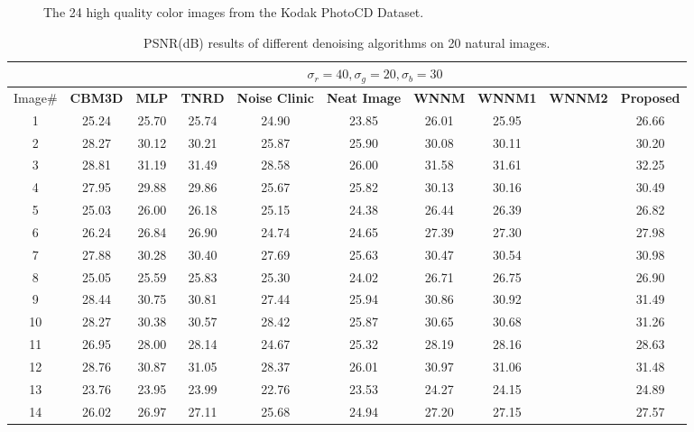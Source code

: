 \documentclass[10pt,twocolumn,letterpaper,sort&compress]{article}
\begin{document}
\begin{figure}
{\begin{minipage}{0.075\textwidth}
\end{minipage}
}\vspace{-1mm}
\caption{The 24 high quality color images from the Kodak PhotoCD Dataset.}
\label{fig3}
\vspace{-2mm}
\end{figure}


\begin{table}
\caption{PSNR(dB) results of different denoising algorithms on 20 natural images.}
\label{taba}
\begin{center}
\renewcommand\arraystretch{1.0}
\scriptsize
\begin{tabular}{|c||c|c|c|c|c|c|c|c|c|}
\hline
&\multicolumn{9}{c|}{ $\sigma_{r} = 40, \sigma_{g} = 20, \sigma_{b} = 30$}
\\
\hline
\hline
Image\#
&
\textbf{CBM3D}
&
\textbf{MLP}
&
\textbf{TNRD}
&
\textbf{Noise Clinic}
&
\textbf{Neat Image}
&
\textbf{WNNM}
&
\textbf{WNNM1}
&
\textbf{WNNM2}
&
\textbf{Proposed}
\\
\hline
1& 25.24 & 25.70 & 25.74 & 24.90 & 23.85 & 26.01 & 25.95 &  & 26.66
\\
\hline
2& 28.27 & 30.12 & 30.21 & 25.87 & 25.90 & 30.08 & 30.11 &  & 30.20 
\\
\hline
3 & 28.81 & 31.19 & 31.49 & 28.58 & 26.00 & 31.58 & 31.61 &  & 32.25  
\\
\hline 
4 & 27.95 & 29.88 & 29.86 & 25.67 & 25.82 & 30.13 & 30.16 &  & 30.49 
\\
\hline
5 & 25.03 & 26.00 & 26.18 & 25.15 & 24.38 & 26.44 & 26.39 &  & 26.82
\\
\hline
6 & 26.24 & 26.84 & 26.90 & 24.74 & 24.65 & 27.39 & 27.30 &  & 27.98 
\\
\hline
7 & 27.88 & 30.28 & 30.40 & 27.69 & 25.63 & 30.47 & 30.54 &  & 30.98 
\\
\hline
8 & 25.05 & 25.59 & 25.83 & 25.30 & 24.02 & 26.71 & 26.75 &  & 26.90
\\
\hline
9 & 28.44 & 30.75 & 30.81 & 27.44 & 25.94 & 30.86 & 30.92 &  & 31.49
\\
\hline
10 & 28.27 & 30.38 & 30.57 & 28.42 & 25.87 & 30.65 & 30.68 &  & 31.26
\\
\hline
11 & 26.95 & 28.00 & 28.14 & 24.67 & 25.32 & 28.19 & 28.16 &  & 28.63
\\
\hline
12 & 28.76 & 30.87 & 31.05 & 28.37 & 26.01 & 30.97 & 31.06 &  & 31.48
\\
\hline
13 & 23.76 & 23.95 & 23.99 & 22.76 & 23.53 & 24.27 & 24.15 &  & 24.89
\\
\hline
14 & 26.02 & 26.97 & 27.11 & 25.68 & 24.94 & 27.20 & 27.15 &  & 27.57

\end{tabular}
\end{center}
\end{table}
\end{document}
